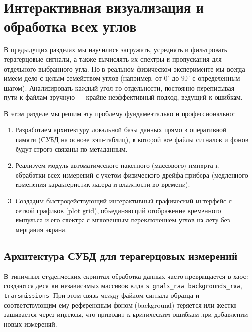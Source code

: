 
\section{Интерактивная визуализация и обработка всех углов}

В предыдущих разделах мы научились загружать, усреднять и фильтровать терагерцовые сигналы, а также вычислять их спектры и пропускания для отдельного выбранного угла. Но в реальном физическом эксперименте мы всегда имеем дело с целым семейством углов (например, от $0^\circ$ до $90^\circ$ с определенным шагом). Анализировать каждый угол по отдельности, постоянно переписывая пути к файлам вручную — крайне неэффективный подход, ведущий к ошибкам.

В этом разделе мы решим эту проблему фундаментально и профессионально:
\begin{enumerate}
    \item Разработаем архитектуру локальной базы данных прямо в оперативной памяти (СУБД на основе хэш-таблиц), в которой все файлы сигналов и фонов будут строго связаны по метаданным.
    \item Реализуем модуль автоматического пакетного (массового) импорта и обработки всех измерений с учетом физического дрейфа прибора (медленного изменения характеристик лазера и влажности во времени).
    \item Создадим быстродействующий интерактивный графический интерфейс с сеткой графиков (plot grid), объединяющий отображение временного импульса и его спектра с мгновенным переключением углов на лету без мерцания экрана.
\end{enumerate}

\subsection{Архитектура СУБД для терагерцовых измерений}

В типичных студенческих скриптах обработка данных часто превращается в хаос: создаются десятки независимых массивов вида \texttt{signals\_raw}, \texttt{backgrounds\_raw}, \texttt{transmissions}. При этом связь между файлом сигнала образца и соответствующим ему референсным фоном (background) теряется или жестко зашивается через индексы, что приводит к критическим ошибкам при добавлении новых измерений.


